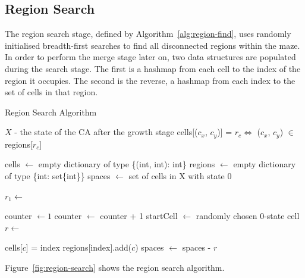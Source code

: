 \subsection{Region Search}

The region search stage, defined by Algorithm~\ref{alg:region-find}, uses randomly initialised breadth-first searches to find all disconnected regions within the maze. In order to perform the merge stage later on, two data structures are populated during the search stage. The first is a hashmap from each cell to the index of the region it occupies. The second is the reverse, a hashmap from each index to the set of cells in that region.

\begin{algorithm}
  \caption{Region Search Algorithm}\label{alg:region-find}
  \begin{algorithmic}
  \Require $X$ - the state of the CA after the growth stage
  \Ensure cells[($c_x$, $c_y$)] = $r_c \iff$ ($c_x$, $c_y$) $\in$ regions[$r_c$]

  \State cells $\gets$ empty dictionary of type \{(int, int): int\}
  \State regions $\gets$ empty dictionary of type \{int: set\{int\}\}
  \State spaces $\gets$ set of cells in X with state 0

  \State $r_1 \gets$ 
  \State {}
  
  \State counter $\gets 1$
    \State counter $\gets$ counter + 1
    \State startCell $\gets$ randomly chosen 0-state cell
    \State $r \gets$ 
    \State {}
  \EndWhile

        \State cells[$c$] = index
        \State regions[index].add($c$)
    \EndFor
    \State spaces $\gets$ spaces - $r$
  \EndProcedure
  \end{algorithmic}
\end{algorithm}

Figure~\ref{fig:region-search} shows the region search algorithm.

